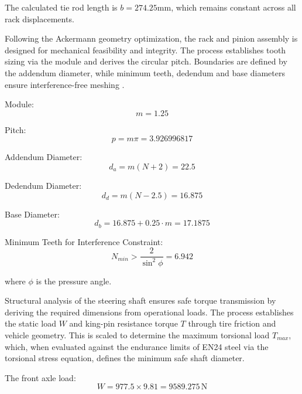 The calculated tie rod length is $b = 274.25 \mathrm{mm}$, which remains constant across all rack displacements. 

Following the Ackermann geometry optimization, the rack and pinion assembly is designed for mechanical feasibility and integrity. The process establishes tooth sizing via the module and derives the circular pitch. Boundaries are defined by the addendum diameter, while minimum teeth, dedendum and base diameters ensure interference-free meshing \parencite{basics-mechanical-engineering}.

Module:
\begin{equation}
    m = 1.25
\end{equation}

Pitch:
\begin{equation}
    p = m\pi = 3.926996817
\end{equation}

Addendum Diameter:
\begin{equation}
    d_a = m(N+2) = 22.5
\end{equation}

Dedendum Diameter:
\begin{equation}
    d_d = m(N-2.5) = 16.875
\end{equation}

Base Diameter:
\begin{equation}
    d_b = 16.875 + 0.25 \cdot m = 17.1875
\end{equation}

Minimum Teeth for Interference Constraint:
\begin{equation}
    N_{min} > \frac{2}{\sin^2\phi} = 6.942
\end{equation}

where $\phi$ is the pressure angle.

Structural analysis of the steering shaft ensures safe torque transmission by deriving the required dimensions from operational loads. The process establishes the static load $W$ and king-pin resistance torque $T$ through tire friction and vehicle geometry. This is scaled to determine the maximum torsional load $T_{max}$, which, when evaluated against the endurance limits of EN24 steel via the torsional stress equation, defines the minimum safe shaft diameter.

The front axle load:
\begin{equation}
    W = 977.5 \times 9.81 = 9589.275 \, \mathrm{N}
\end{equation}

